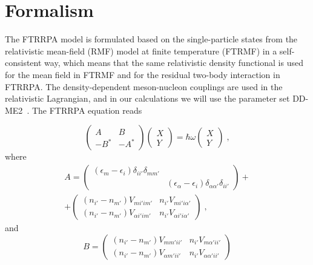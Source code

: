 \documentclass[prc,twocolumn,twoside,showpacs,superscriptaddress,floatfix]{revtex4-1}
\begin{document}
\section{Formalism}\label{sec:formalism}

The FTRRPA model is formulated based on the single-particle states from the
relativistic mean-field (RMF) model at finite temperature (FTRMF) in a
self-consistent way, which means that the same relativistic density functional
is used for the mean field in FTRMF and for the residual two-body interaction
in FTRRPA. The density-dependent meson-nucleon couplings are used in the
relativistic Lagrangian, and in our calculations we will use the parameter set
DD-ME2~\cite{Lala}.
The FTRRPA equation reads~\cite{Niu_2009}

\begin{equation}
   \left( \begin{array}{cc} A & B \\ -B^* & -A^* \end{array} \right)
   \left( \begin{array}{c} X \\ Y \end{array} \right)
   = \hbar\omega \left( \begin{array}{c} X \\ Y \end{array} \right) \;,
\end{equation}
where
\begin{multline}
   A = \left( \begin{array}{cc} (\epsilon_m - \epsilon_i)
   \delta_{ii'} \delta_{mm'} &  \\
   & (\epsilon_\alpha - \epsilon_i) \delta_{\alpha \alpha'}
   \delta_{ii'} \end{array} \right) + \\
   + \left( \begin{array}{cc} (n_{i'} - n_{m'})V_{mi'im'} & n_{i'} V_{mi'i\alpha'} \\
   (n_{i'} - n_{m'})V_{\alpha i' i m'}  &n_{i'} V_{\alpha i' i \alpha'} \end{array}
   \right) \;,
  \end{multline}
  and
\begin{equation}
   B =\left( \begin{array}{cc} (n_{i'} - n_{m'})V_{mm'ii'} & n_{i'}V_{m\alpha'ii'} \\
    (n_{i'} - n_{m'})V_{\alpha m' i i'}  & n_{i'}  V_{\alpha \alpha' i i' } \end{array}
    \right)
  \end{equation}
\end{document}
